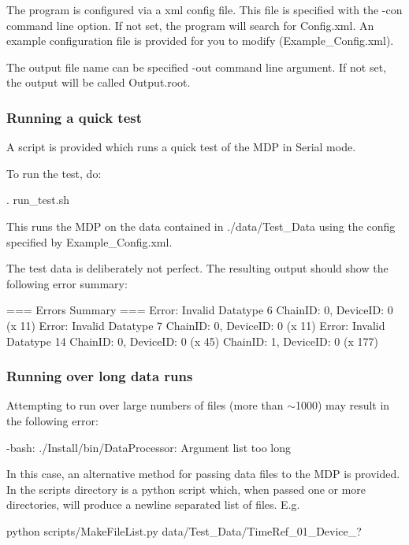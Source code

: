 The program is configured via a xml config file. This file is specified with the {\ttfamily -\/con} command line option. If not set, the program will search for {\ttfamily Config.\+xml}. An example configuration file is provided for you to modify ({\ttfamily Example\+\_\+\+Config.\+xml}).

The output file name can be specified {\ttfamily -\/out} command line argument. If not set, the output will be called {\ttfamily Output.\+root}.

\subsubsection*{Running a quick test \label{_RunQuickTest}%
}

A script is provided which runs a quick test of the M\+DP in {\ttfamily Serial} mode.

To run the test, do\+: 
\begin{DoxyCode}
. run\_test.sh
\end{DoxyCode}


This runs the M\+DP on the data contained in {\ttfamily ./data/\+Test\+\_\+\+Data} using the config specified by {\ttfamily Example\+\_\+\+Config.\+xml}.

The test data is deliberately not perfect. The resulting output should show the following error summary\+: 
\begin{DoxyCode}
=== Errors Summary ===
Error: Invalid Datatype 6
        ChainID: 0, DeviceID: 0 (x 11)
Error: Invalid Datatype 7
        ChainID: 0, DeviceID: 0 (x 11)
Error: Invalid Datatype 14
        ChainID: 0, DeviceID: 0 (x 45)
        ChainID: 1, DeviceID: 0 (x 177)
\end{DoxyCode}


\subsubsection*{Running over long data runs \label{_RunLongRuns}%
}

Attempting to run over large numbers of files (more than $\sim$1000) may result in the following error\+: 
\begin{DoxyCode}
-bash: ./Install/bin/DataProcessor: Argument list too long
\end{DoxyCode}


In this case, an alternative method for passing data files to the M\+DP is provided. In the {\ttfamily scripts} directory is a python script which, when passed one or more directories, will produce a newline separated list of files. E.\+g. 
\begin{DoxyCode}
python scripts/MakeFileList.py data/Test\_Data/TimeRef\_01\_Device\_?
\end{DoxyCode}


